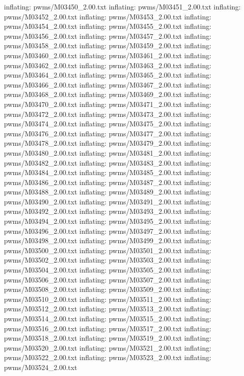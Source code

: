 \documentclass[letterpaper,10pt,english]{sphinxmanual}
\begin{document}
{\begin{sphinxVerbatim}[commandchars=\\\{\}]
  inflating: pwms/M03450\_2.00.txt
  inflating: pwms/M03451\_2.00.txt
  inflating: pwms/M03452\_2.00.txt
  inflating: pwms/M03453\_2.00.txt
  inflating: pwms/M03454\_2.00.txt
  inflating: pwms/M03455\_2.00.txt
  inflating: pwms/M03456\_2.00.txt
  inflating: pwms/M03457\_2.00.txt
  inflating: pwms/M03458\_2.00.txt
  inflating: pwms/M03459\_2.00.txt
  inflating: pwms/M03460\_2.00.txt
  inflating: pwms/M03461\_2.00.txt
  inflating: pwms/M03462\_2.00.txt
  inflating: pwms/M03463\_2.00.txt
  inflating: pwms/M03464\_2.00.txt
  inflating: pwms/M03465\_2.00.txt
  inflating: pwms/M03466\_2.00.txt
  inflating: pwms/M03467\_2.00.txt
  inflating: pwms/M03468\_2.00.txt
  inflating: pwms/M03469\_2.00.txt
  inflating: pwms/M03470\_2.00.txt
  inflating: pwms/M03471\_2.00.txt
  inflating: pwms/M03472\_2.00.txt
  inflating: pwms/M03473\_2.00.txt
  inflating: pwms/M03474\_2.00.txt
  inflating: pwms/M03475\_2.00.txt
  inflating: pwms/M03476\_2.00.txt
  inflating: pwms/M03477\_2.00.txt
  inflating: pwms/M03478\_2.00.txt
  inflating: pwms/M03479\_2.00.txt
  inflating: pwms/M03480\_2.00.txt
  inflating: pwms/M03481\_2.00.txt
  inflating: pwms/M03482\_2.00.txt
  inflating: pwms/M03483\_2.00.txt
  inflating: pwms/M03484\_2.00.txt
  inflating: pwms/M03485\_2.00.txt
  inflating: pwms/M03486\_2.00.txt
  inflating: pwms/M03487\_2.00.txt
  inflating: pwms/M03488\_2.00.txt
  inflating: pwms/M03489\_2.00.txt
  inflating: pwms/M03490\_2.00.txt
  inflating: pwms/M03491\_2.00.txt
  inflating: pwms/M03492\_2.00.txt
  inflating: pwms/M03493\_2.00.txt
  inflating: pwms/M03494\_2.00.txt
  inflating: pwms/M03495\_2.00.txt
  inflating: pwms/M03496\_2.00.txt
  inflating: pwms/M03497\_2.00.txt
  inflating: pwms/M03498\_2.00.txt
  inflating: pwms/M03499\_2.00.txt
  inflating: pwms/M03500\_2.00.txt
  inflating: pwms/M03501\_2.00.txt
  inflating: pwms/M03502\_2.00.txt
  inflating: pwms/M03503\_2.00.txt
  inflating: pwms/M03504\_2.00.txt
  inflating: pwms/M03505\_2.00.txt
  inflating: pwms/M03506\_2.00.txt
  inflating: pwms/M03507\_2.00.txt
  inflating: pwms/M03508\_2.00.txt
  inflating: pwms/M03509\_2.00.txt
  inflating: pwms/M03510\_2.00.txt
  inflating: pwms/M03511\_2.00.txt
  inflating: pwms/M03512\_2.00.txt
  inflating: pwms/M03513\_2.00.txt
  inflating: pwms/M03514\_2.00.txt
  inflating: pwms/M03515\_2.00.txt
  inflating: pwms/M03516\_2.00.txt
  inflating: pwms/M03517\_2.00.txt
  inflating: pwms/M03518\_2.00.txt
  inflating: pwms/M03519\_2.00.txt
  inflating: pwms/M03520\_2.00.txt
  inflating: pwms/M03521\_2.00.txt
  inflating: pwms/M03522\_2.00.txt
  inflating: pwms/M03523\_2.00.txt
  inflating: pwms/M03524\_2.00.txt

\end{sphinxVerbatim}}
\end{document}
